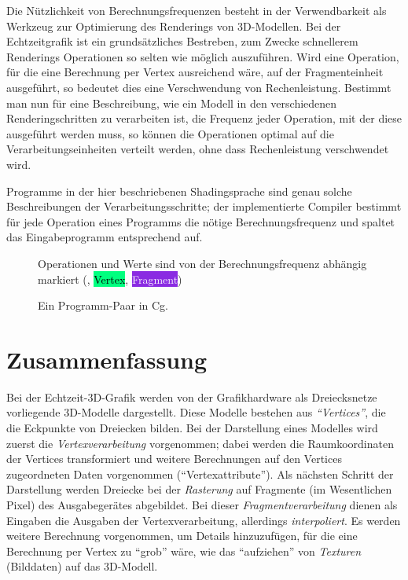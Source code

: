 \documentclass[twoside,a4paper,fleqn,12pt]{book}
\begin{document}
Die Nützlichkeit von Berechnungsfrequenzen besteht in der Verwendbarkeit als Werkzeug zur Optimierung des Renderings von 3D-Modellen.
Bei der Echtzeitgrafik ist ein grundsätzliches Bestreben, zum Zwecke schnellerem Renderings Operationen so selten wie möglich auszuführen.
Wird eine Operation, für die eine Berechnung per Vertex ausreichend wäre, auf der Fragmenteinheit ausgeführt, so bedeutet dies
eine Verschwendung von Rechenleistung. Bestimmt man nun für eine Beschreibung, wie ein Modell in den verschiedenen Renderingschritten zu
verarbeiten ist, die Frequenz jeder Operation, mit der diese ausgeführt werden muss, so können die Operationen optimal auf die
Verarbeitungseinheiten verteilt werden, ohne dass Rechenleistung verschwendet wird.

Programme in der hier beschriebenen Shadingsprache sind genau solche Beschreibungen der Verarbeitungsschritte; der implementierte Compiler
bestimmt für jede Operation eines Programms die nötige Berechnungsfrequenz und spaltet das Eingabeprogramm entsprechend auf.

\newcommand\freqPerMesh[1]{\framebox{#1}}
\newcommand\freqPerVert[1]{\colorbox{SpringGreen}{\textcolor{Black}{#1}}}
\newcommand\freqPerFrag[1]{\colorbox{BlueViolet}{\textcolor{White}{#1}}}
\begin{figure}[hp]
  
  \caption{Ein Programm-Paar in Cg.}
  \centering
  \small Operationen und Werte sind von der Berechnungsfrequenz abhängig markiert (\freqPerMesh{Mesh}, \freqPerVert{Vertex}, \freqPerFrag{Fragment})
  \label{fig:simple_cg}
\end{figure}

\section{Zusammenfassung}

Bei der Echtzeit-3D-Grafik werden von der Grafikhardware als Dreiecksnetze vorliegende 3D-Modelle dargestellt.
Diese Modelle bestehen aus \emph{``Vertices''}, die die Eckpunkte von Dreiecken bilden. Bei der Darstellung eines
Modelles wird zuerst die \emph{Vertexverarbeitung} vorgenommen; dabei werden die Raumkoordinaten der Vertices transformiert
und weitere Berechnungen auf den Vertices zugeordneten Daten vorgenommen ("`Vertexattribute"').
Als nächsten Schritt der Darstellung werden Dreiecke bei der \emph{Rasterung} auf Fragmente (im Wesentlichen Pixel) des Ausgabegerätes abgebildet.
Bei dieser \emph{Fragmentverarbeitung} dienen als Eingaben die Ausgaben der Vertexverarbeitung, allerdings \emph{interpoliert}.
Es werden weitere Berechnung vorgenommen, um Details hinzuzufügen, für die eine Berechnung per Vertex zu "`grob"' wäre,
wie das "`aufziehen"' von \emph{Texturen} (Bilddaten) auf das 3D-Modell.
\end{document}

